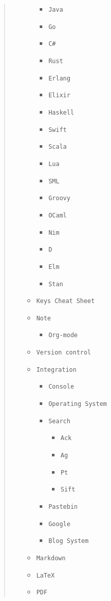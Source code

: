 \documentclass[11pt]{article}
\begin{document}
\begin{quote}
\begin{itemize}
\begin{itemize}
\begin{itemize}
\begin{itemize}
\end{itemize}
\item \texttt{Java}
\item \texttt{Go}
\item \texttt{C\#}
\item \texttt{Rust}
\item \texttt{Erlang}
\item \texttt{Elixir}
\item \texttt{Haskell}
\item \texttt{Swift}
\item \texttt{Scala}
\item \texttt{Lua}
\item \texttt{SML}
\item \texttt{Groovy}
\item \texttt{OCaml}
\item \texttt{Nim}
\item \texttt{D}
\item \texttt{Elm}
\item \texttt{Stan}
\end{itemize}
\item \texttt{Keys Cheat Sheet}
\item \texttt{Note}
\begin{itemize}
\item \texttt{Org-mode}
\end{itemize}
\item \texttt{Version control}
\item \texttt{Integration}
\begin{itemize}
\item \texttt{Console}
\item \texttt{Operating System}
\item \texttt{Search}
\begin{itemize}
\item \texttt{Ack}
\item \texttt{Ag}
\item \texttt{Pt}
\item \texttt{Sift}
\end{itemize}
\item \texttt{Pastebin}
\item \texttt{Google}
\item \texttt{Blog System}
\end{itemize}
\item \texttt{Markdown}
\item \texttt{\LaTeX{}}
\item \texttt{PDF}

\end{itemize}
\end{itemize}
\end{quote}
\end{document}

